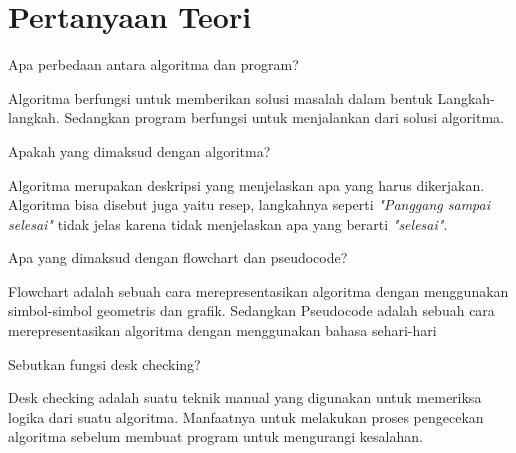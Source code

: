 \documentclass[
  12pt,
  answers  
]{exam}
\begin{document}
	\section{Pertanyaan Teori}
	\begin{questions}
		\question Apa perbedaan antara algoritma dan program?
	\begin{solution}
		Algoritma berfungsi untuk memberikan solusi masalah dalam bentuk Langkah-langkah. Sedangkan program berfungsi untuk menjalankan dari solusi algoritma.
	\end{solution}

	\question Apakah yang dimaksud dengan algoritma?
	\begin{solution}
		Algoritma merupakan deskripsi yang menjelaskan apa yang harus dikerjakan. Algoritma bisa disebut juga yaitu resep, langkahnya seperti \emph{"Panggang sampai selesai"} tidak jelas karena tidak menjelaskan apa yang berarti \emph{"selesai"}.
	\end{solution}

		\question Apa yang dimaksud dengan flowchart dan pseudocode?
	\begin{solution}
		Flowchart adalah sebuah cara merepresentasikan algoritma dengan menggunakan simbol-simbol geometris dan grafik. Sedangkan Pseudocode adalah sebuah cara merepresentasikan algoritma dengan menggunakan bahasa sehari-hari
	\end{solution}

		\question Sebutkan fungsi desk checking? 
	\begin{solution}
		Desk checking adalah suatu teknik manual yang digunakan untuk memeriksa logika dari suatu algoritma. Manfaatnya untuk melakukan proses pengecekan algoritma sebelum membuat program untuk mengurangi kesalahan.
	\end{solution}
	

\end{questions}
\end{document}
